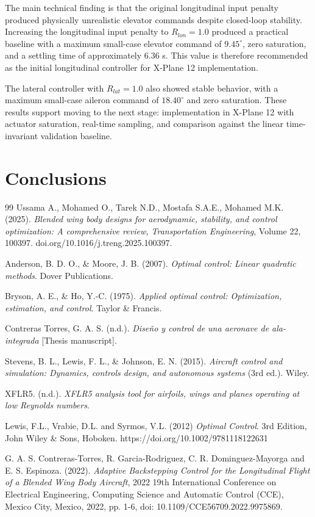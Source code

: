 \documentclass[10pt]{article}
\begin{document}
The main technical finding is that the original longitudinal input penalty produced physically unrealistic elevator commands despite closed-loop stability. Increasing the longitudinal input penalty to $R_{lon}=1.0$ produced a practical baseline with a maximum small-case elevator command of $9.45^\circ$, zero saturation, and a settling time of approximately 6.36 s. This value is therefore recommended as the initial longitudinal controller for X-Plane 12 implementation.

The lateral controller with $R_{lat}=1.0$ also showed stable behavior, with a maximum small-case aileron command of $18.40^\circ$ and zero saturation. These results support moving to the next stage: implementation in X-Plane 12 with actuator saturation, real-time sampling, and comparison against the linear time-invariant validation baseline.

\section{Conclusions}



\begin{thebibliography}{99}
Ussama A., Mohamed O., Tarek N.D., Mostafa S.A.E., Mohamed M.K. (2025).
\textit{Blended wing body designs for aerodynamic, stability, and control optimization: A comprehensive review,
Transportation Engineering},
Volume 22, 100397.
doi.org/10.1016/j.treng.2025.100397.

Anderson, B. D. O., \& Moore, J. B. (2007). \textit{Optimal control: Linear quadratic methods}. Dover Publications.

Bryson, A. E., \& Ho, Y.-C. (1975). \textit{Applied optimal control: Optimization, estimation, and control}. Taylor \& Francis.

Contreras Torres, G. A. S. (n.d.). \textit{Dise\~no y control de una aeronave de ala-integrada} [Thesis manuscript].

Stevens, B. L., Lewis, F. L., \& Johnson, E. N. (2015). \textit{Aircraft control and simulation: Dynamics, controls design, and autonomous systems} (3rd ed.). Wiley.

XFLR5. (n.d.). \textit{XFLR5 analysis tool for airfoils, wings and planes operating at low Reynolds numbers}.

Lewis, F.L., Vrabie, D.L. and Syrmos, V.L. (2012) \textit{Optimal Control}. 3rd Edition, John Wiley & Sons, Hoboken.
https://doi.org/10.1002/9781118122631

G. A. S. Contreras-Torres, R. Garcia-Rodriguez, C. R. Dominguez-Mayorga and E. S. Espinoza. (2022). \textit{Adaptive Backstepping Control for the Longitudinal Flight of a Blended Wing Body Aircraft}, 2022 19th International Conference on Electrical Engineering, Computing Science and Automatic Control (CCE), Mexico City, Mexico, 2022, pp. 1-6, doi: 10.1109/CCE56709.2022.9975869.
\end{thebibliography}
\end{document}
